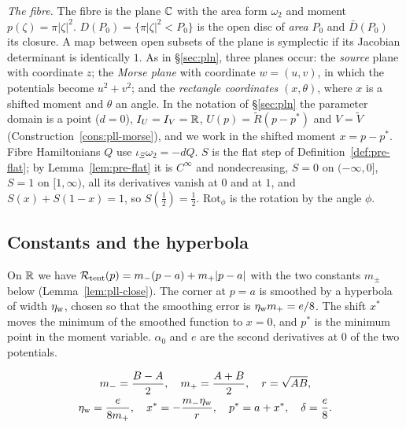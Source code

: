 \emph{The fibre.} The fibre is the plane $\mathbb{C}$ with the area form $\omega_2$ and moment $p(\zeta)=\pi|\zeta|^2$.
$D(P_0)=\{\pi|\zeta|^2<P_0\}$ is the open disc of \emph{area} $P_0$ and $\bar D(P_0)$ its closure. A map between
open subsets of the plane is symplectic if its Jacobian determinant is identically $1$. As in \S\ref{sec:pln},
three planes occur: the \emph{source} plane with coordinate $z$; the \emph{Morse plane} with coordinate
$w=(u,v)$, in which the potentials become $u^2+v^2$; and the \emph{rectangle coordinates} $(x,\theta)$, where $x$
is a shifted moment and $\theta$ an angle. In the notation of \S\ref{sec:pln} the parameter domain is a point
($d=0$), $I_U=I_V=\mathbb{R}$,
$U(p)=\tilde R(p-p^*)$ and $V=\tilde V$ (Construction~\ref{cons:pll-morse}), and we work in the shifted moment
$x=p-p^*$. Fibre Hamiltonians $Q$ use $\iota_\Xi\omega_2=-dQ$. $S$ is the flat step of
Definition~\ref{def:pre-flat}; by Lemma~\ref{lem:pre-flat} it is $C^\infty$ and nondecreasing, $S=0$ on
$(-\infty,0]$, $S=1$ on $[1,\infty)$, all its derivatives vanish at $0$ and at $1$, and $S(x)+S(1-x)=1$, so
$S(\frac12)=\frac12$. $\mathrm{Rot}_\phi$ is the rotation by the angle $\phi$.

\subsection{Constants and the hyperbola}\label{sec:pll-constants}

On $\mathbb{R}$ we have $\mathcal{R}_{\rm tent}(p)=m_-(p-a)+m_+|p-a|$ with the two constants $m_\pm$ below
(Lemma~\ref{lem:pll-close}). The corner at $p=a$ is smoothed by a hyperbola of width $\eta_{\rm w}$, chosen so that the
smoothing error is $\eta_{\rm w} m_+=e/8$. The shift $x^*$ moves the minimum of the smoothed function to $x=0$, and $p^*$
is the minimum point in the moment variable. $\alpha_0$ and $e$ are the second derivatives at $0$ of the two
potentials.

\begin{definition}[Constants]\label{def:pll-constants}
\begin{gather*}
 m_-=\frac{B-A}{2},\quad m_+=\frac{A+B}{2},\quad r=\sqrt{AB},\\
 \eta_{\rm w}=\frac{e}{8m_+},\quad
 x^*=-\frac{m_-\eta_{\rm w}}{r},\quad p^*=a+x^*,\quad \delta=\frac e8 .
\end{gather*}
\end{definition}

